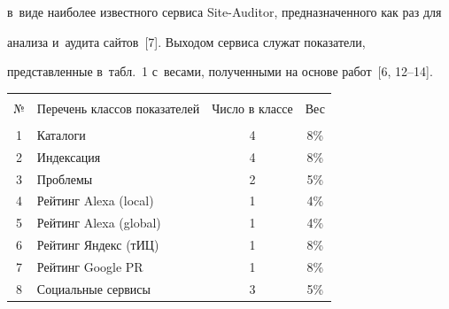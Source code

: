 в~виде наиболее известного сервиса Site-Auditor, предназначенного как раз для 


анализа и~аудита сайтов~[7]. Выходом сервиса служат показатели, 


представленные в~табл.~1 с~весами, полученными на основе работ~[6, 12--14]. 





\begin{table}[b]\small %


\vspace*{-13pt}


\begin{center}







\vspace*{2ex}





\begin{tabular}{|c|l|c|c|}


\hline


&&&\\[-9pt]


№&\multicolumn{1}{c|}{Перечень классов показателей}&Число в классе&Вес\\


\hline


&&&\\[-10pt]


1&Каталоги&4&\hphantom{9}8\%\\


2&Индексация&4&\hphantom{9}8\%\\


3&Проблемы&2&\hphantom{9}5\%\\


4&Рейтинг Alexa (local)&1&\hphantom{9}4\%\\


5&Рейтинг Alexa (global)&1&\hphantom{9}4\%\\


6&Рейтинг Яндекс (тИЦ)&1&\hphantom{9}8\%\\


7&Рейтинг Google PR&1&\hphantom{9}8\%\\


8&Социальные сервисы&3&\hphantom{9}5\%\\



\end{tabular}
\end{center}
\end{table}
